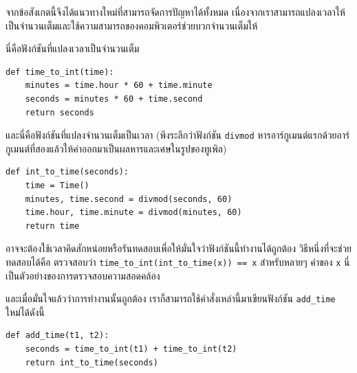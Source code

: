 จากข้อสังเกตนี้จึงได้แนวทางใหม่ที่สามารถจัดการปัญหาได้ทั้งหมด 
เนื่องจากเราสามารถแปลงเวลาให้เป็นจำนวนเต็มและใช้ความสามารถของคอมพิวเตอร์ช่วยบวกจำนวนเต็มให้


นี่คือฟังก์ชันที่แปลงเวลาเป็นจำนวนเต็ม

\begin{verbatim}
def time_to_int(time):
    minutes = time.hour * 60 + time.minute
    seconds = minutes * 60 + time.second
    return seconds
\end{verbatim}
%

และนี่คือฟังก์ชันที่แปลงจำนวนเต็มเป็นเวลา (พึงระลึกว่าฟังก์ชัน {\tt divmod} 
หารอาร์กูเมนต์แรกด้วยอาร์กูเมนต์ที่สองแล้วให้ค่าออกมาเป็นผลหารและเศษในรูปของทูเพิล)

\begin{verbatim}
def int_to_time(seconds):
    time = Time()
    minutes, time.second = divmod(seconds, 60)
    time.hour, time.minute = divmod(minutes, 60)
    return time
\end{verbatim}
%

อาจจะต้องใช้เวลาคิดสักหน่อยหรือรันทดสอบเพื่อให้มั่นใจว่าฟังก์ชันนี้ทำงานได้ถูกต้อง  วิธีหนึ่งที่จะช่วยทดสอบได้คือ ตรวจสอบว่า
\verb"time_to_int(int_to_time(x)) == x" สำหรับหลายๆ ค่าของ {\tt x} นี่เป็นตัวอย่างของการตรวจสอบความสอดคล้อง


และเมื่อมั่นใจแล้วว่าการทำงานนั้นถูกต้อง เราก็สามารถใช้คำสั่งเหล่านี้มาเขียนฟังก์ชัน \verb"add_time" ใหม่ได้ดังนี้

\begin{verbatim}
def add_time(t1, t2):
    seconds = time_to_int(t1) + time_to_int(t2)
    return int_to_time(seconds)
\end{verbatim}
%

